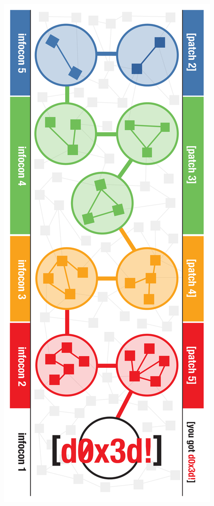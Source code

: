\documentclass{letter}
\begin{document}
\includegraphics{mats/threat-meter_front} \\
\end{document}
